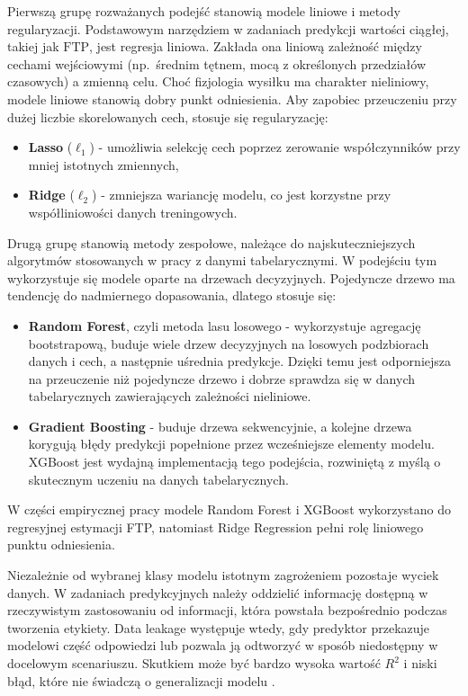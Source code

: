 Pierwszą grupę rozważanych podejść stanowią modele liniowe i metody regularyzacji.
Podstawowym narzędziem w zadaniach predykcji wartości ciągłej, takiej jak $\mathrm{FTP}$, jest regresja liniowa.
Zakłada ona liniową zależność między cechami wejściowymi (np.\ średnim tętnem, mocą z określonych przedziałów czasowych) a zmienną celu.
Choć fizjologia wysiłku ma charakter nieliniowy, modele liniowe stanowią dobry punkt odniesienia.
Aby zapobiec przeuczeniu przy dużej liczbie skorelowanych cech, stosuje się regularyzację:
\begin{itemize}
  \item \textbf{Lasso} ($\ell_1$) - umożliwia selekcję cech poprzez zerowanie współczynników przy mniej istotnych zmiennych,
  \item \textbf{Ridge} ($\ell_2$) - zmniejsza wariancję modelu, co jest korzystne przy współliniowości danych treningowych.
\end{itemize}

Drugą grupę stanowią metody zespołowe, należące do najskuteczniejszych algorytmów stosowanych w pracy z danymi tabelarycznymi.
W podejściu tym wykorzystuje się modele oparte na drzewach decyzyjnych.
Pojedyncze drzewo ma tendencję do nadmiernego dopasowania, dlatego stosuje się:
\begin{itemize}
  \item \textbf{Random Forest}, czyli metoda lasu losowego - wykorzystuje agregację bootstrapową, buduje wiele drzew decyzyjnych na losowych podzbiorach danych i cech, a następnie uśrednia predykcje. Dzięki temu jest odporniejsza na przeuczenie niż pojedyncze drzewo i dobrze sprawdza się w danych tabelarycznych zawierających zależności nieliniowe.
  \item \textbf{Gradient Boosting} - buduje drzewa sekwencyjnie, a kolejne drzewa korygują błędy predykcji popełnione przez wcześniejsze elementy modelu. XGBoost jest wydajną implementacją tego podejścia, rozwiniętą z myślą o skutecznym uczeniu na danych tabelarycznych.
\end{itemize}

W części empirycznej pracy modele Random Forest i XGBoost wykorzystano do regresyjnej estymacji FTP, natomiast Ridge Regression pełni rolę liniowego punktu odniesienia.

Niezależnie od wybranej klasy modelu istotnym zagrożeniem pozostaje wyciek danych.
W zadaniach predykcyjnych należy oddzielić informację dostępną w rzeczywistym zastosowaniu od informacji, która powstała bezpośrednio podczas tworzenia etykiety. Data leakage występuje wtedy, gdy predyktor przekazuje modelowi część odpowiedzi lub pozwala ją odtworzyć w sposób niedostępny w docelowym scenariuszu. Skutkiem może być bardzo wysoka wartość $R^2$ i niski błąd, które nie świadczą o generalizacji modelu \parencite{kaufman2012leakage,bernett2024leakage}.

